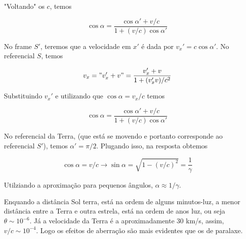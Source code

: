 \documentclass[11pt]{article}
\begin{document}
\begin{pproblem}
\begin{pssolution*}{}{}
\begin{alternativas}
            "Voltando" os \(c\), temos

            \[\boxed{\cos\alpha = \frac{\cos\alpha' + v/c}{1+(v/c)\cos\alpha'}}\]


            \item No frame \(S'\), teremos que a velocidade em \(x'\) é dada por \(v_x' = c\cos\alpha'\). No referencial \(S\), temos
            
            \[v_x = "v_x'+v" = \frac{v_x'+v}{1+(v_x'v)/c^2}\]

            Substituindo \(v_x'\) e utilizando que \(\cos\alpha = v_x/c\) temos

            \[\boxed{\cos\alpha =\frac{\cos\alpha' + v/c}{1+(v/c)\cos\alpha'}} \]

            \item No referencial da Terra, (que está se movendo e portanto corresponde ao referencial \(S'\)), temos \(\alpha' = \pi/2\). Plugando isso, na resposta obtemos
            
            \[\cos\alpha = v/c \rightarrow \sin\alpha = \sqrt{1-(v/c)^2} = \frac{1}{\gamma}\]

            Utilziando a aproximação para pequenos ângulos, \(\boxed{\alpha \approx 1/\gamma}\).

            \item Enquando a distância Sol terra, está na ordem de alguns minutos-luz, a menor distância entre a Terra e outra estrela, está na ordem de anos luz, ou seja \(\theta \sim 10^{-6}\). Já a velocidade da Terra é a aproximadamente \(30\) km/s, assim, \(v/c \sim 10^{-4}\). Logo os efeitos de aberração são mais evidentes que os de paralaxe.


        \end{alternativas}

        \end{pssolution*}

\end{pproblem}
\end{document}
